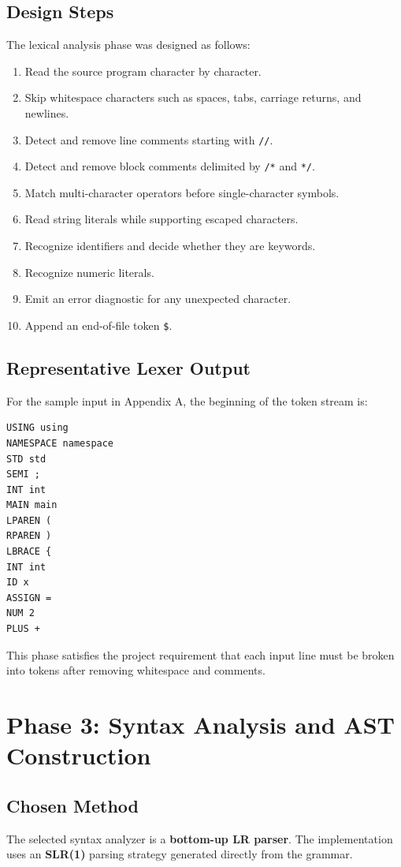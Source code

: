 \documentclass[12pt,a4paper]{article}
\begin{document}
\subsection{Design Steps}
The lexical analysis phase was designed as follows:

\begin{enumerate}
    \item Read the source program character by character.
    \item Skip whitespace characters such as spaces, tabs, carriage returns, and newlines.
    \item Detect and remove line comments starting with \texttt{//}.
    \item Detect and remove block comments delimited by \texttt{/*} and \texttt{*/}.
    \item Match multi-character operators before single-character symbols.
    \item Read string literals while supporting escaped characters.
    \item Recognize identifiers and decide whether they are keywords.
    \item Recognize numeric literals.
    \item Emit an error diagnostic for any unexpected character.
    \item Append an end-of-file token \texttt{\$}.
\end{enumerate}

\subsection{Representative Lexer Output}
For the sample input in Appendix A, the beginning of the token stream is:

\begin{lstlisting}
USING using
NAMESPACE namespace
STD std
SEMI ;
INT int
MAIN main
LPAREN (
RPAREN )
LBRACE {
INT int
ID x
ASSIGN =
NUM 2
PLUS +
\end{lstlisting}

This phase satisfies the project requirement that each input line must be broken into tokens after removing whitespace and comments.

\section{Phase 3: Syntax Analysis and AST Construction}
\subsection{Chosen Method}
The selected syntax analyzer is a \textbf{bottom-up LR parser}. The implementation uses an \textbf{SLR(1)} parsing strategy generated directly from the grammar.
\end{document}
